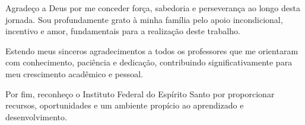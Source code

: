 Agradeço a Deus por me conceder força, sabedoria e perseverança ao longo desta jornada. Sou profundamente grato à minha família pelo apoio incondicional, incentivo e amor, fundamentais para a realização deste trabalho. 

Estendo meus sinceros agradecimentos a todos os professores que me orientaram com conhecimento, paciência e dedicação, contribuindo significativamente para meu crescimento acadêmico e pessoal.

Por fim, reconheço o Instituto Federal do Espírito Santo por proporcionar recursos, oportunidades e um ambiente propício ao aprendizado e desenvolvimento.